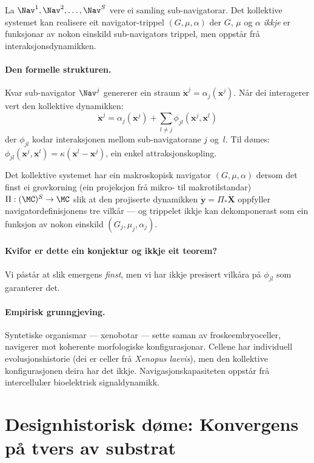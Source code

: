 \begin{konmark}\label{conj:L.7.3}
La $\Nav^1, \Nav^2, \ldots, \Nav^S$ vere ei samling
sub-navigatorar. Det kollektive systemet kan realisere eit
navigator-trippel $(G, \mu, \alpha)$ der $G$, $\mu$ og $\alpha$
\emph{ikkje} er funksjonar av nokon einskild sub-navigators
trippel, men oppstår frå interaksjonsdynamikken.
\end{konmark}

\paragraph{Den formelle strukturen.}
Kvar sub-navigator $\Nav^j$ genererer ein straum
$\dot{\bm{x}}^j = \alpha_j(\bm{x}^j)$. Når dei interagerer vert
den kollektive dynamikken:
\[
  \dot{\bm{x}}^j = \alpha_j(\bm{x}^j)
  + \sum_{l \neq j} \phi_{jl}(\bm{x}^j, \bm{x}^l)
\]
der $\phi_{jl}$ kodar interaksjonen mellom sub-navigatorane $j$
og~$l$. Til dømes: $\phi_{jl}(\bm{x}^j, \bm{x}^l)
= \kappa (\bm{x}^l - \bm{x}^j)$, ein enkel attraksjonskopling.

Det kollektive systemet har ein makroskopisk navigator
$(G, \mu, \alpha)$ dersom det finst ei grovkorning (ein projeksjon
frå mikro- til makrotilstandar)
$\Pi : (\MC)^S \to \MC$ slik at den projiserte dynamikken
$\dot{\bm{y}} = \Pi_* \dot{\bm{X}}$ oppfyller
navigatordefinisjonens tre vilkår --- og trippelet ikkje kan
dekomponerast som ein funksjon av nokon einskild
$(G_j, \mu_j, \alpha_j)$.

\paragraph{Kvifor er dette ein konjektur og ikkje eit teorem?}
Vi påstår at slik emergens \emph{finst}, men vi har ikkje
presisert vilkåra på $\phi_{jl}$ som garanterer det.

\paragraph{Empirisk grunngjeving.}
Syntetiske organismar --- xenobotar --- sette saman av
froskeembryoceller, navigerer mot koherente morfologiske
konfigurasjonar. Cellene har individuell evolusjonshistorie (dei
er celler frå \emph{Xenopus laevis}), men den kollektive
konfigurasjonen deira har det ikkje. Navigasjonskapasiteten
oppstår frå intercellulær bioelektrisk signaldynamikk.


\section{Designhistorisk døme: Konvergens på tvers av substrat}


